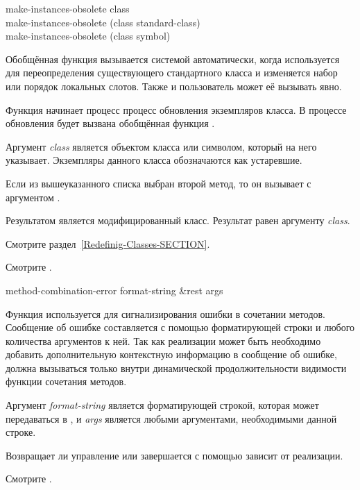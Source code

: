 \begin{defun}
make-instances-obsolete class \\
make-instances-obsolete (class standard-class) \\
make-instances-obsolete (class symbol)

Обобщённая функция  вызывается системой
автоматически, когда используется  для переопределения
существующего стандартного класса и изменяется набор или порядок локальных
слотов. Также и пользователь может её вызывать явно.

Функция  начинает процесс процесс обновления
экземпляров класса. В процессе обновления будет вызвана обобщённая функция
.

Аргумент \emph{class} является объектом класса или символом, который на него
указывает. Экземпляры данного класса обозначаются как устаревшие.

Если из вышеуказанного списка выбран второй метод, то он вызывает
 с аргументом .

Результатом является модифицированный класс. Результат
 равен  аргументу \emph{class}.

Смотрите раздел~\ref{Redefinig-Classes-SECTION}.

Смотрите .
\end{defun}

\begin{defun}[Функция]
method-combination-error format-string &rest args

Функция  используется для сигнализирования ошибки
в сочетании методов. Сообщение об ошибке составляется с помощью форматирующей
строки и любого количества аргументов к ней. Так как реализации может быть
необходимо добавить дополнительную контекстную информацию в сообщение об ошибке,
 должна вызываться только внутри динамической
продолжительности видимости функции сочетания методов.

Аргумент \emph{format-string} является форматирующей строкой, которая может
передаваться в , и \emph{args} является любыми аргументами,
необходимыми данной строке.

Возвращает ли  управление или завершается с
помощью  зависит от реализации.

Смотрите .
\end{defun}

